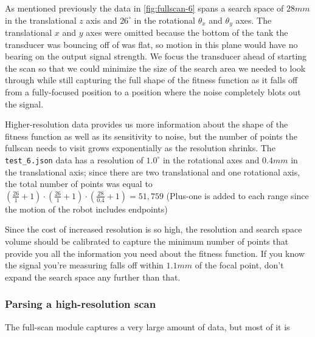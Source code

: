 \documentclass[11pt]{article}
\begin{document}
As mentioned previously the data in \autoref{fig:fullscan-6} spans a search space of $28 mm$ in the translational $z$ axis and $26^\circ$ in the rotational $\theta_x$ and $\theta_y$ axes. The translational $x$ and $y$ axes were omitted because the bottom of the tank the transducer was bouncing off of was flat, so motion in this plane would have no bearing on the output signal strength.
We focus the transducer ahead of starting the scan so that we could minimize the size of the search area we needed to look through while still capturing the full shape of the fitness function as it falls off from a fully-focused position to a position where the noise completely blots out the signal.

Higher-resolution data provides us more information about the shape of the fitness function as well as its sensitivity to noise, but the number of points the fullscan needs to visit grows exponentially as the resolution shrinks.
The \texttt{test\_6.json} data has a resolution of $1.0^\circ$ in the rotational axes and $0.4 mm$ in the translational axis; since there are two translational and one rotational axis, the total number of points was equal to $\left(\frac{26}{1} + 1\right) \cdot \left(\frac{26}{1} + 1\right) \cdot \left(\frac{28}{0.4} + 1\right) = 51,759$ (Plus-one is added to each range since the motion of the robot includes endpoints)

Since the cost of increased resolution is so high, the resolution and search space volume should be calibrated to capture the minimum number of points that provide you all the information you need about the fitness function. If you know the signal you're measuring falls off within $1.1mm$ of the focal point, don't expand the search space any further than that.

\subsubsection{Parsing a high-resolution scan}
The full-scan module captures a very large amount of data, but most of it is
\end{document}
